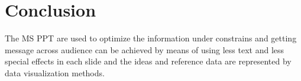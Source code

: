 \chapter{\textbf{Conclusion}}



The  MS PPT are used to optimize the  information under constrains and getting message across audience can be achieved by means of using less text and less special effects in each slide and the ideas and reference data are represented by data visualization methods.

